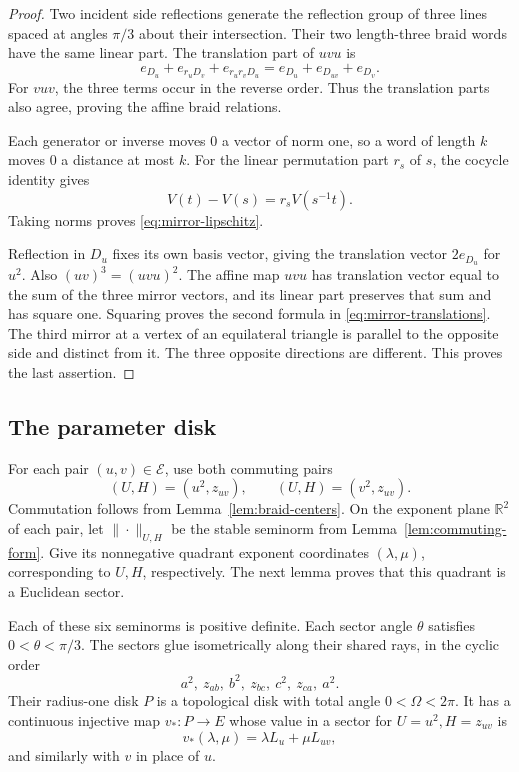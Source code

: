 \begin{proof}
Two incident side reflections generate the reflection group of three
lines spaced at angles \(\pi/3\) about their intersection.  Their two
length-three braid words have the same linear part.  The translation
part of \(uvu\) is
\[
 e_{D_u}+e_{r_uD_v}+e_{r_ur_vD_u}
 =e_{D_u}+e_{D_{uv}}+e_{D_v}.
\]
For \(vuv\), the three terms occur in the reverse order.  Thus the
translation parts also agree, proving the affine braid relations.

Each generator or inverse moves \(0\) a vector of norm one, so a word
of length \(k\) moves \(0\) a distance at most \(k\).  For the linear
permutation part \(r_s\) of \(s\), the cocycle identity gives
\[
 V(t)-V(s)=r_s V(s^{-1}t).
\]
Taking norms proves \eqref{eq:mirror-lipschitz}.

Reflection in \(D_u\) fixes its own basis vector, giving the translation
vector \(2e_{D_u}\) for \(u^2\).  Also
\((uv)^3=(uvu)^2\).  The affine map \(uvu\) has translation vector equal
to the sum of the three mirror vectors, and its linear part preserves
that sum and has square one.  Squaring proves the second formula in
\eqref{eq:mirror-translations}.  The third mirror at a vertex of an
equilateral triangle is parallel to the opposite side and distinct from
it.  The three opposite directions are different.  This proves the
last assertion.
\end{proof}

\subsection{The parameter disk}

For each pair \((u,v)\in\mathcal E\), use both commuting pairs
\[
 (U,H)=(u^2,z_{uv}),\qquad (U,H)=(v^2,z_{uv}).
\]
Commutation follows from Lemma~\ref{lem:braid-centers}.
On the exponent plane \(\mathbb R^2\) of each pair, let
\(\|\cdot\|_{U,H}\) be the stable seminorm from
Lemma~\ref{lem:commuting-form}.  Give its nonnegative quadrant exponent
coordinates \((\lambda,\mu)\), corresponding to \(U,H\), respectively.
The next lemma proves that this quadrant is a Euclidean sector.

\begin{lemma}\label{lem:sector-data}
Each of these six seminorms is positive definite.  Each sector angle
\(\theta\) satisfies \(0<\theta<\pi/3\).
The sectors glue isometrically along their shared rays, in the cyclic
order
\begin{equation}\label{eq:ray-order}
 a^2,\ z_{ab},\ b^2,\ z_{bc},\ c^2,\ z_{ca},\ a^2.
\end{equation}
Their radius-one disk \(P\) is a topological disk with total angle
\(0<\Omega<2\pi\).  It has a continuous injective map \(v_*:P\to E\)
whose value in a sector for \(U=u^2,H=z_{uv}\) is
\begin{equation}\label{eq:separating-coordinates}
 v_*(\lambda,\mu)=\lambda L_u+\mu L_{uv},
\end{equation}
and similarly with \(v\) in place of \(u\).
\end{lemma}

